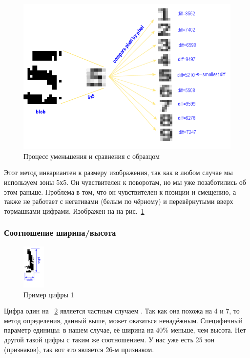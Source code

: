 \begin{figure}[ht!]
  \centering
  \includegraphics[width=\textwidth]{inc/raster/design2-11.png}
  \caption{Процесс уменьшения и сравнения с образцом}
  \label{fig:fig211}
\end{figure}
Этот метод инвариантен к размеру изображения, так как в любом случае мы используем зоны 5х5. Он чувствителен к поворотам, но мы уже позаботились об этом раньше. Проблема в том, что он чувствителен к позиции и смещению, а также не работает с негативами (белым по чёрному) и перевёрнутыми вверх тормашками цифрами. Изображен на на рис.~\ref{fig:fig211}

\subsubsection{Соотношение ширина/высота}

\begin{figure}[ht!]
  \centering
  \includegraphics[width=0.1\textwidth]{inc/raster/design2-12.png}
  \caption{Пример цифры 1}
  \label{fig:fig212}
\end{figure}
Цифра один на ~\ref{fig:fig212} является частным случаем . Так как она похожа на 4 и 7, то метод определения, данный выше, может оказаться ненадёжным. Специфичный параметр единицы: в нашем случае, её ширина на 40\% меньше, чем высота. Нет другой такой цифры с таким же соотношением. У нас уже есть 25 зон (признаков), так вот это является 26-м признаком.


